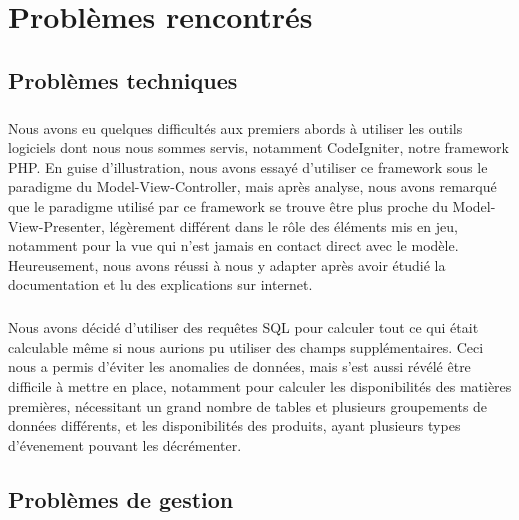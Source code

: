 \chapter{Problèmes rencontrés}


\section{Problèmes techniques}
    \paragraph{}
        Nous avons eu quelques difficultés aux premiers abords à utiliser les 
        outils logiciels dont nous nous sommes servis, notamment CodeIgniter, notre
        framework PHP.
        En guise d'illustration, nous avons essayé d'utiliser ce framework 
        sous le paradigme du Model-View-Controller, mais après analyse,
        nous avons remarqué que le paradigme utilisé par ce framework
        se trouve être plus proche du
        Model-View-Presenter, légèrement différent dans le rôle
        des éléments mis en jeu, notamment pour la vue qui n'est
        jamais en contact direct avec le modèle.
        Heureusement, nous avons réussi à nous y adapter après avoir étudié
        la documentation et lu des explications sur internet.

    \paragraph{}
        Nous avons décidé d'utiliser des requêtes SQL pour calculer tout ce qui
        était calculable même si nous aurions pu utiliser des champs
        supplémentaires.
        Ceci nous a permis d'éviter les anomalies de données, mais s'est aussi
        révélé être difficile à mettre en place, notamment pour calculer les 
        disponibilités des matières premières, nécessitant un grand nombre de 
        tables et plusieurs groupements de données différents, et les
        disponibilités des produits, ayant plusieurs types d'évenement pouvant
        les décrémenter.
        
\section{Problèmes de gestion}
